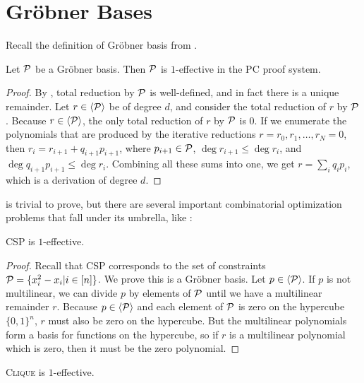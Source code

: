 \section{Gr\"obner Bases}
Recall the definition of Gr\"obner basis from .
\begin{lemma}\label{lem:grobnereffective}
Let $\mathcal P$ be a Gr\"obner basis. Then $\mathcal P$ is $1$-effective in the PC proof system.
\end{lemma}
\begin{proof}
By , total reduction by $\mathcal P$ is well-defined, and in fact there is a unique 
remainder. Let $r \in \langle \mathcal P \rangle$ be of degree $d$, and consider the total reduction of $r$ by $\mathcal P$. Because $r \in \langle \mathcal P \rangle$, the only total reduction of $r$ by $\mathcal P$ is $0$. If we enumerate the polynomials that are produced by the iterative reductions $r = r_0, r_1, \dots, r_N = 0$, then 
$r_i = r_{i+1} + q_{i+1}p_{i+1}$, where $p_{i+1} \in \mathcal P$, $\deg r_{i+1} \leq \deg r_i$, and $\deg q_{i+1}p_{i+1} \leq \deg r_i$. Combining all these sums into one, we get
$r = \sum_i q_i p_i$, which is a derivation of degree $d$. 
\end{proof}
 is trivial to prove, but there are several important combinatorial optimization problems that fall 
under its umbrella, like :
\begin{corollary}\label{cor:csp-effective}
\textsc{CSP} is $1$-effective.
\end{corollary}
\begin{proof}
Recall that \textsc{CSP} corresponds to the set of constraints $\mathcal P = \{x_i^2 - x_i | i \in [n]\}$. We prove this is a Gr\"obner basis. 
Let $p \in \langle \mathcal P \rangle$. If $p$ is not multilinear, we can divide $p$ by elements of $\mathcal P$ until we have a multilinear remainder $r$. Because 
$p \in \langle \mathcal P \rangle$ and each element of $\mathcal P$ is zero on the hypercube $\{0, 1\}^n$, $r$ must also be zero on the hypercube. But the multilinear
polynomials form a basis for functions on the hypercube, so if $r$ is a multilinear polynomial which is zero, then it must be the zero polynomial. 
\end{proof}
\begin{corollary}
\textsc{Clique} is $1$-effective.
\end{corollary}
